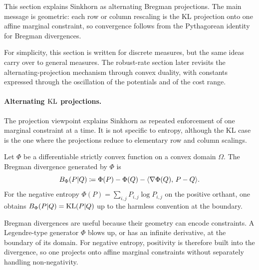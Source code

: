 This section explains Sinkhorn as alternating Bregman projections. The main message is geometric: each row or column rescaling is the KL projection onto one affine marginal constraint, so convergence follows from the Pythagorean identity for Bregman divergences.

For simplicity, this section is written for discrete measures, but the same ideas carry over to general measures. The robust-rate section later revisits the alternating-projection mechanism through convex duality, with constants expressed through the oscillation of the potentials and of the cost range.

\paragraph{Alternating $\operatorname{KL}$ projections.}

The projection viewpoint explains Sinkhorn as repeated enforcement of one marginal constraint at a time. It is not specific to entropy, although the KL case is the one where the projections reduce to elementary row and column scalings.

\begin{defn}\label{def-bregman-divergence}
	Let $\Phi$ be a differentiable strictly convex function on a convex domain $\Omega$. The Bregman divergence generated by $\Phi$ is
	\[
		B_\Phi(P|Q)\coloneqq \Phi(P)-\Phi(Q)-\langle \nabla\Phi(Q),\,P-Q\rangle.
	\]
	For the negative entropy $\Phi(P)=\sum_{i,j}P_{i,j}\log P_{i,j}$ on the positive orthant, one obtains $B_\Phi(P|Q)=\mathrm{KL}(P|Q)$ up to the harmless convention at the boundary.
\end{defn}

Bregman divergences are useful because their geometry can encode constraints. A Legendre-type generator $\Phi$ blows up, or has an infinite derivative, at the boundary of its domain. For negative entropy, positivity is therefore built into the divergence, so one projects onto affine marginal constraints without separately handling non-negativity.

